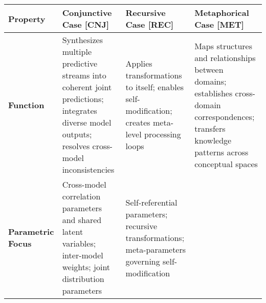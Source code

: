 \begin{longtable}[]{@{}llll@{}}
\toprule
\begin{minipage}[b]{0.11\columnwidth}\raggedright
Property\strut
\end{minipage} & \begin{minipage}[b]{0.26\columnwidth}\raggedright
Conjunctive Case {[}CNJ{]}\strut
\end{minipage} & \begin{minipage}[b]{0.24\columnwidth}\raggedright
Recursive Case {[}REC{]}\strut
\end{minipage} & \begin{minipage}[b]{0.27\columnwidth}\raggedright
Metaphorical Case {[}MET{]}\strut
\end{minipage}\tabularnewline
\midrule
\endhead
\begin{minipage}[t]{0.11\columnwidth}\raggedright
\textbf{Function}\strut
\end{minipage} & \begin{minipage}[t]{0.26\columnwidth}\raggedright
Synthesizes multiple predictive streams into coherent joint predictions;
integrates diverse model outputs; resolves cross-model
inconsistencies\strut
\end{minipage} & \begin{minipage}[t]{0.24\columnwidth}\raggedright
Applies transformations to itself; enables self-modification; creates
meta-level processing loops\strut
\end{minipage} & \begin{minipage}[t]{0.27\columnwidth}\raggedright
Maps structures and relationships between domains; establishes
cross-domain correspondences; transfers knowledge patterns across
conceptual spaces\strut
\end{minipage}\tabularnewline
\begin{minipage}[t]{0.11\columnwidth}\raggedright
\textbf{Parametric Focus}\strut
\end{minipage} & \begin{minipage}[t]{0.26\columnwidth}\raggedright
Cross-model correlation parameters and shared latent variables;
inter-model weights; joint distribution parameters\strut
\end{minipage} & \begin{minipage}[t]{0.24\columnwidth}\raggedright
Self-referential parameters; recursive transformations; meta-parameters
governing self-modification\strut
\end{minipage} & \begin{minipage}[t]{0.27\columnwidth}\raggedright

\end{minipage}
\end{longtable}

